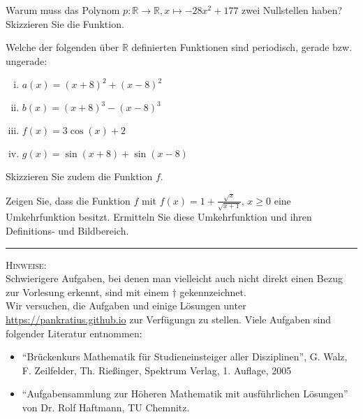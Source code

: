 \documentclass[11pt]{article}
\begin{document}
\begin{task}
	Warum muss das Polynom $p:\mathbb{R}\to \mathbb{R},x\mapsto -28x^2+177$ zwei Nullstellen haben? Skizzieren Sie die Funktion.
\end{task}
\begin{task}
Welche der folgenden \"uber $\mathbb{R}$ definierten Funktionen sind periodisch, gerade bzw. ungerade:
\begin{enumerate}[i)]
	\item $a(x)=(x+8)^2+(x-8)^2$
	\item $b(x)=(x+8)^3-(x-8)^3$
	\item $f(x) = 3\cos(x)+2$
	\item $g(x)=\sin(x+8)+\sin(x-8)$
\end{enumerate}
Skizzieren Sie zudem die Funktion $f$.
\end{task}
\begin{htask}
	Zeigen Sie, dass die Funktion $f$ mit $f(x)=1+\frac{\sqrt{x}}{\sqrt{x+1}}$, $x \geq 0$ eine Umkehrfunktion besitzt. Ermitteln Sie diese Umkehrfunktion und ihren Definitions- und Bildbereich.
\end{htask}

\hrule
\vspace{.5cm}
\noindent
\textsc{Hinweise:}\\
Schwierigere Aufgaben, bei denen man vielleicht auch nicht direkt einen Bezug zur Vorlesung erkennt, sind mit einem $\dagger$ gekennzeichnet.\\
Wir versuchen, die Aufgaben und einige Lösungen unter \url{https://pankratius.github.io} zur Verfügungn zu stellen.
Viele Aufgaben sind folgender Literatur entnommen:
\begin{itemize}
	\item ``Br\"uckenkurs Mathematik f\"ur Studieneinsteiger aller Disziplinen'', G. Walz, F. Zeilfelder, Th. Rie\ss inger, Spektrum Verlag, 1. Auflage, 2005
	\item ``Aufgabensammlung zur H\"oheren Mathematik mit ausf\"uhrlichen L\"osungen'' von Dr. Rolf Haftmann, TU Chemnitz.
\end{itemize}
\end{document}
